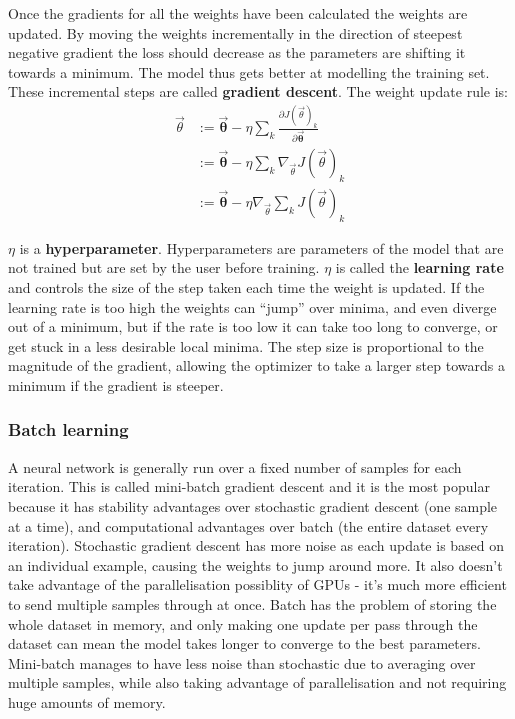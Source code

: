 Once the gradients for all the weights have been calculated the weights are updated. By moving the weights incrementally in the direction of steepest 
negative gradient the loss should decrease as the parameters are shifting it towards a minimum. The model thus gets
better at modelling the training set. These incremental steps are called \textbf{gradient descent}. The weight update rule is: 
\begin{align}
  \vec{\theta} & := \mathbf{\vec{\theta}} - \eta \sum_{k} \frac{\partial J(\vec{\theta})_k}{\partial \mathbf{\vec{\theta}}} \\
  & := \mathbf{\vec{\theta}} - \eta \sum_{k} \nabla_{\vec{\theta}} J(\vec{\theta})_k \\
  & := \mathbf{\vec{\theta}} - \eta \nabla_{\vec{\theta}} \sum_{k} J(\vec{\theta})_k \label{eq:weight}
\end{align}

$\eta$ is a \textbf{hyperparameter}. Hyperparameters are parameters of the model that are not trained but are set by the user before training.
$\eta$ is called the \textbf{learning rate} and controls the size of the step taken each time the weight is updated. If the learning rate is 
too high the weights can ``jump'' over minima, and even diverge out of a minimum, but if the rate is too low it can take too long to converge,
or get stuck in a less desirable local minima. The step size is proportional to the magnitude of the gradient, allowing the optimizer to 
take a larger step towards a minimum if the gradient is steeper.

\subsubsection{Batch learning} \label{batch}

A neural network is generally run over a fixed number of samples for each iteration. This is called 
mini-batch gradient descent and it is the most popular because it has stability advantages over stochastic gradient descent (one sample at a time),
and computational advantages over batch (the entire dataset every iteration). 
Stochastic gradient descent has more noise as each update is based on an individual example, causing the weights to jump around more. It also doesn't take advantage of the 
parallelisation possiblity of GPUs - it's much more efficient to send multiple samples through at once. Batch has the problem of storing the whole 
dataset in memory, and only making one update per pass through the dataset can mean the model takes longer to converge to the best parameters. Mini-batch manages to
have less noise than stochastic due to averaging over multiple samples, while also taking advantage of parallelisation and not requiring huge amounts of memory.

